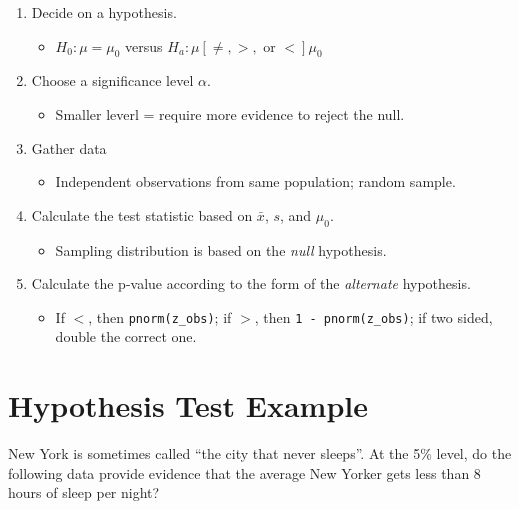 \documentclass[
  letterpaper,
  DIV=11,
  numbers=noendperiod]{scrreprt}
\providecommand{\tightlist}{%
  \setlength{\itemsep}{0pt}\setlength{\parskip}{0pt}}\usepackage{longtable,booktabs,array}
\def\lspace{}
\begin{document}
\begin{enumerate}
\def\labelenumi{\arabic{enumi}.}
\tightlist
\item
  Decide on a hypothesis.

  \begin{itemize}
  \tightlist
  \item
    \(H_0: \mu = \mu_0\) versus
    \(H_a: \mu [\ne,>,\text{ or }<] \mu_0\)\lspace
  \end{itemize}
\item
  Choose a significance level \(\alpha\).

  \begin{itemize}
  \tightlist
  \item
    Smaller leverl = require more evidence to reject the null.\lspace
  \end{itemize}
\item
  Gather data

  \begin{itemize}
  \tightlist
  \item
    Independent observations from same population; random sample.\lspace
  \end{itemize}
\item
  Calculate the test statistic based on \(\bar x\), \(s\), and
  \(\mu_0\).

  \begin{itemize}
  \tightlist
  \item
    Sampling distribution is based on the \emph{null} hypothesis.\lspace
  \end{itemize}
\item
  Calculate the p-value according to the form of the \emph{alternate}
  hypothesis.

  \begin{itemize}
  \tightlist
  \item
    If \(<\), then \texttt{pnorm(z\_obs)}; if \(>\), then
    \texttt{1\ -\ pnorm(z\_obs)}; if two sided, double the correct one.
  \end{itemize}
\end{enumerate}

\hypertarget{hypothesis-test-example}{%
\section{Hypothesis Test Example}\label{hypothesis-test-example}}

New York is sometimes called ``the city that never sleeps''. At the 5\%
level, do the following data provide evidence that the average New
Yorker gets less than 8 hours of sleep per night?
\end{document}
